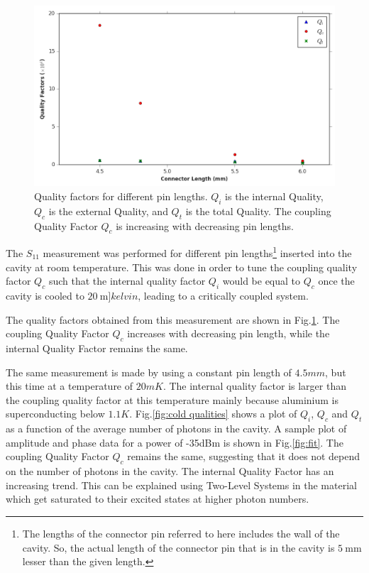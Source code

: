 \begin{figure}
\centering
\includegraphics[width=\linewidth]{Figures/diff_lengths.png}
\decoRule
\caption[Quality Factors for different pin lengths]{Quality factors for different pin lengths. $Q_i$ is the internal Quality, $Q_c$ is the external Quality, and $Q_t$ is the total Quality. The coupling Quality Factor $Q_c$ is increasing with decreasing pin lengths.}
\label{fig:diff lengths}
\end{figure}

The $S_{11}$ measurement was performed for different pin lengths\footnote{The lengths of the connector pin referred to here includes the wall of the cavity. So, the actual length of the connector pin that is in the cavity is $\SI{5}{\milli\meter}$ lesser than the given length.} inserted into the cavity at room temperature. This was done in order to tune the coupling quality factor $Q_c$ such that the internal quality factor $Q_i$ would be equal to $Q_c$ once the cavity is cooled to $\SI{20}{\milli]kelvin}$, leading to a critically coupled system.

The quality factors obtained from this measurement are shown in Fig.\ref{fig:diff lengths}. The coupling Quality Factor $Q_c$ increases with decreasing pin length, while the internal Quality Factor remains the same.

The same measurement is made by using a constant pin length of $4.5 mm$, but this time at a temperature of $20mK$. The internal quality factor is larger than the coupling quality factor at this temperature mainly because aluminium is superconducting below $1.1K$. Fig.\ref{fig:cold qualities} shows a plot of $Q_i$, $Q_c$ and $Q_t$ as a function of the average number of photons in the cavity. A sample plot of amplitude and phase data for a power of -35dBm is shown in Fig.\ref{fig:fit}. The coupling Quality Factor $Q_c$ remains the same, suggesting that it does not depend on the number of photons in the cavity. The internal Quality Factor has an increasing trend. This can be explained using Two-Level Systems in the material which get saturated to their excited states at higher photon numbers\cite{Gao2007}.

